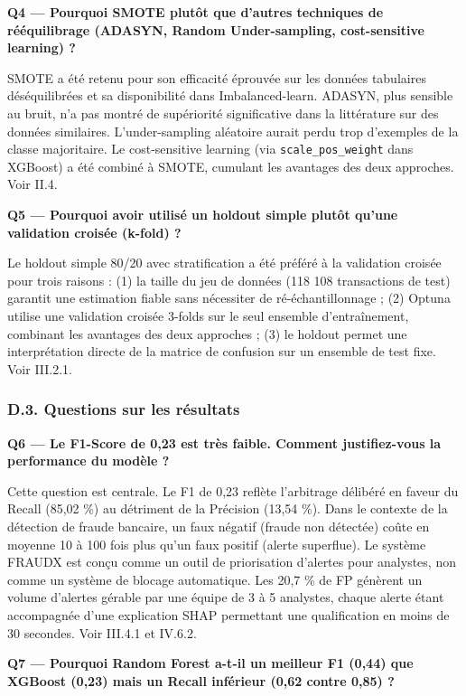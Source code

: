 \documentclass[
  12pt,
]{article}
\begin{document}
\textbf{Q4 — Pourquoi SMOTE plutôt que d’autres techniques de
rééquilibrage (ADASYN, Random Under-sampling, cost-sensitive learning)
?}

SMOTE a été retenu pour son efficacité éprouvée sur les données
tabulaires déséquilibrées et sa disponibilité dans Imbalanced-learn.
ADASYN, plus sensible au bruit, n’a pas montré de supériorité
significative dans la littérature sur des données similaires.
L’under-sampling aléatoire aurait perdu trop d’exemples de la classe
majoritaire. Le cost-sensitive learning (via \texttt{scale\_pos\_weight}
dans XGBoost) a été combiné à SMOTE, cumulant les avantages des deux
approches. Voir II.4.

\textbf{Q5 — Pourquoi avoir utilisé un holdout simple plutôt qu’une
validation croisée (k-fold) ?}

Le holdout simple 80/20 avec stratification a été préféré à la
validation croisée pour trois raisons : (1) la taille du jeu de données
(118 108 transactions de test) garantit une estimation fiable sans
nécessiter de ré-échantillonnage ; (2) Optuna utilise une validation
croisée 3-folds sur le seul ensemble d’entraînement, combinant les
avantages des deux approches ; (3) le holdout permet une interprétation
directe de la matrice de confusion sur un ensemble de test fixe. Voir
III.2.1.

\subsubsection{D.3. Questions sur les
résultats}\label{d.3.-questions-sur-les-ruxe9sultats}

\textbf{Q6 — Le F1-Score de 0,23 est très faible. Comment justifiez-vous
la performance du modèle ?}

Cette question est centrale. Le F1 de 0,23 reflète l’arbitrage délibéré
en faveur du Recall (85,02 \%) au détriment de la Précision (13,54 \%).
Dans le contexte de la détection de fraude bancaire, un faux négatif
(fraude non détectée) coûte en moyenne 10 à 100 fois plus qu’un faux
positif (alerte superflue). Le système FRAUDX est conçu comme un outil
de priorisation d’alertes pour analystes, non comme un système de
blocage automatique. Les 20,7 \% de FP génèrent un volume d’alertes
gérable par une équipe de 3 à 5 analystes, chaque alerte étant
accompagnée d’une explication SHAP permettant une qualification en moins
de 30 secondes. Voir III.4.1 et IV.6.2.

\textbf{Q7 — Pourquoi Random Forest a-t-il un meilleur F1 (0,44) que
XGBoost (0,23) mais un Recall inférieur (0,62 contre 0,85) ?}
\end{document}

